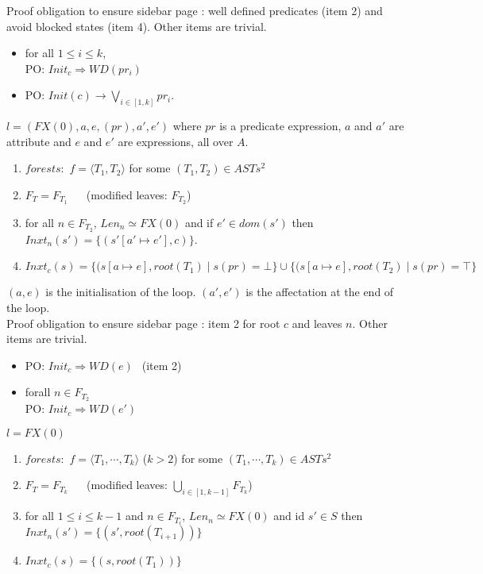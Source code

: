 \documentclass{article}
\begin{document}
Proof obligation to ensure sidebar page \pageref{safestates}: well defined predicates (item 2) and avoid blocked states (item 4). Other items are trivial.
\begin{itemize}
\item for all $1\leq i\leq k$,\\
      PO: $Init_c\Rightarrow W\!D(pr_i)$
\item PO: $Init(c)\rightarrow \bigvee_{i\in[1,k]}pr_i$.
\end{itemize}
\begin{definition}[LOOP] $l=(FX(0),a,e,(pr),a',e')$ where $pr$ is a predicate expression, $a$ and $a'$ are attribute and $e$ and $e'$ are expressions, all over $A$.
\begin{enumerate} 
\item $forests:$  $f=\langle T_1,T_2\rangle$ for some $(T_1,T_2)\in AST\!s^2$
\item $F_T=F_{T_1}~~~~~~$ {\small (modified leaves: $F_{T_2}$)}
\item for all $n\in F_{T_2}$, $Len_n\simeq FX(0)$ and if $e'\in dom(s')$ then $Inxt_n(s')=\{(s'[a'\mapsto e'],c)\}$.
\item $Inxt_c(s)=\{(s[a\mapsto e],root(T_1)\mid s(pr)=\bot\}\cup\{(s[a\mapsto e],root(T_2)\mid s(pr)=\top\}$
\end{enumerate}
\end{definition}
$(a,e)$ is the initialisation of the loop. $(a',e')$ is the affectation at the end of the loop.\\
Proof obligation to ensure sidebar page \pageref{safestates}: item 2 for root $c$ and leaves $n$. Other items are trivial.
\begin{itemize}
\item PO: $Init_c\Rightarrow W\!D(e)~~$ (item 2)
\item forall $n\in F_{T_2}$\\
      PO: $Init_c\Rightarrow W\!D(e')~~$
\end{itemize}
\begin{definition}[SEQ] $l=FX(0)$
\begin{enumerate} 
\item $forests:$  $f=\langle T_1,\cdots,T_k\rangle$ ($k>2$) for some $(T_1,\cdots,T_k)\in AST\!s^2$
\item $F_T=F_{T_k}~~~~~~$ {\small (modified leaves: $\bigcup_{i\in[1,k-1]}F_{T_k}$)}
\item for all $1\leq i\leq k-1$ and $n\in F_{T_i}$, $Len_n\simeq FX(0)$ and id $s'\in S$ then $Inxt_n(s')=\{(s',root(T_{i+1}))\}$
\item $Inxt_c(s)=\{(s,root(T_{1}))\}$
\end{enumerate}
\end{definition}
\end{document}
